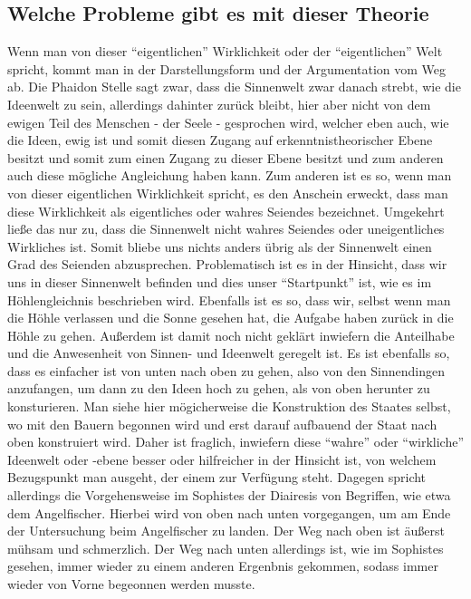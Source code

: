 \documentclass[12pt]{article}
\begin{document}
\subsection{Welche Probleme gibt es mit dieser Theorie}
Wenn man von dieser \enquote{eigentlichen} Wirklichkeit oder der \enquote{eigentlichen} Welt spricht, kommt man in der Darstellungsform und der Argumentation vom Weg ab. Die Phaidon Stelle sagt zwar, dass die Sinnenwelt zwar danach strebt, wie die Ideenwelt zu sein, allerdings dahinter zurück bleibt, hier aber nicht von dem ewigen Teil des Menschen - der Seele - gesprochen wird, welcher eben auch, wie die Ideen, ewig ist und somit diesen Zugang auf erkenntnistheorischer Ebene besitzt und somit zum einen Zugang zu dieser Ebene besitzt und zum anderen auch diese mögliche Angleichung haben kann. 
Zum anderen ist es so, wenn man von dieser eigentlichen Wirklichkeit spricht, es den Anschein erweckt, dass man diese Wirklichkeit als eigentliches oder wahres Seiendes bezeichnet. Umgekehrt ließe das nur zu, dass die Sinnenwelt nicht wahres Seiendes oder uneigentliches Wirkliches ist. Somit bliebe uns nichts anders übrig als der Sinnenwelt einen Grad des Seienden abzusprechen. Problematisch ist es in der Hinsicht, dass wir uns in dieser Sinnenwelt befinden und dies unser \enquote{Startpunkt} ist, wie es im Höhlengleichnis beschrieben wird. Ebenfalls ist es so, dass wir, selbst wenn man die Höhle verlassen und die Sonne gesehen hat, die Aufgabe haben zurück in die Höhle zu gehen.
Außerdem ist damit noch nicht geklärt inwiefern die Anteilhabe und die Anwesenheit von Sinnen- und Ideenwelt geregelt ist.
Es ist ebenfalls so, dass es einfacher ist von unten nach oben zu gehen, also von den Sinnendingen anzufangen, um dann zu den Ideen hoch zu gehen, als von oben herunter zu konsturieren. Man siehe hier mögicherweise die Konstruktion des Staates selbst, wo mit den Bauern begonnen wird und erst darauf aufbauend der Staat nach oben konstruiert wird. Daher ist fraglich, inwiefern diese \enquote{wahre} oder \enquote{wirkliche} Ideenwelt oder -ebene besser oder hilfreicher in der Hinsicht ist, von welchem Bezugspunkt man ausgeht, der einem zur Verfügung steht. Dagegen spricht allerdings die Vorgehensweise im Sophistes der Diairesis von Begriffen, wie etwa dem Angelfischer. Hierbei wird von oben nach unten vorgegangen, um am Ende der Untersuchung beim Angelfischer zu landen. Der Weg nach oben ist äußerst mühsam und schmerzlich. Der Weg nach unten allerdings ist, wie im Sophistes gesehen, immer wieder zu einem anderen Ergenbnis gekommen, sodass immer wieder von Vorne begeonnen werden musste.
\end{document}

